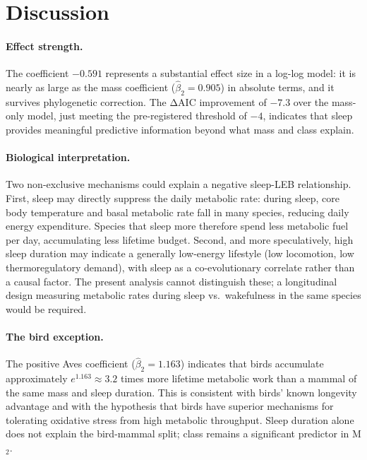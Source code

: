 \documentclass{article}
\begin{document}

\section{Discussion}
\label{sec:discussion}

\paragraph{Effect strength.}
The coefficient $-0.591$ represents a substantial effect size in a
log-log model: it is nearly as large as the mass coefficient ($\hat\beta_2 = 0.905$)
in absolute terms, and it survives phylogenetic correction. The ΔAIC improvement of
$-7.3$ over the mass-only model, just meeting the pre-registered threshold of $-4$,
indicates that sleep provides meaningful predictive information beyond what mass and
class explain.

\paragraph{Biological interpretation.}
Two non-exclusive mechanisms could explain a negative sleep-LEB relationship. First,
sleep may directly suppress the daily metabolic rate: during sleep, core body
temperature and basal metabolic rate fall in many species, reducing daily energy
expenditure. Species that sleep more therefore spend less metabolic fuel per day,
accumulating less lifetime budget. Second, and more speculatively, high sleep duration
may indicate a generally low-energy lifestyle (low locomotion, low thermoregulatory
demand), with sleep as a co-evolutionary correlate rather than a causal factor. The
present analysis cannot distinguish these; a longitudinal design measuring metabolic
rates during sleep vs.\ wakefulness in the same species would be required.

\paragraph{The bird exception.}
The positive Aves coefficient ($\hat\beta_2 = 1.163$) indicates that birds accumulate
approximately $e^{1.163} \approx 3.2$ times more lifetime metabolic work than a mammal
of the same mass and sleep duration. This is consistent with birds' known longevity
advantage and with the hypothesis that birds have superior mechanisms for tolerating
oxidative stress from high metabolic throughput. Sleep duration alone does not explain
the bird-mammal split; class remains a significant predictor in M$_2$.
\end{document}
